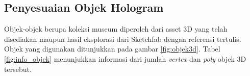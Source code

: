 	\subsection{Penyesuaian Objek Hologram}
	\vspace{1ex}
		Objek-objek berupa koleksi museum diperoleh dari asset 3D yang telah disediakan maupun hasil eksplorasi dari Sketchfab dengan referensi tertulis. Objek yang digunakan ditunjukkan pada gambar \ref{fig:objek3d}. Tabel \ref{fig:info_objek} menunjukkan informasi dari jumlah \textit{vertex} dan \textit{poly} objek 3D tersebut.
		\begin{figure} [H]
			\hspace{0.1em}
			\hspace{0.1em}
			\hspace{0.1em}

\end{figure}
